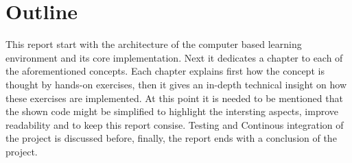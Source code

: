 \section{Outline}

This report start with the architecture of the computer based learning environment and its core implementation. Next it dedicates a chapter to each of the aforementioned concepts. Each chapter explains first how the concept is thought by hands-on exercises, then it gives an in-depth technical insight on how these exercises are implemented. At this point it is needed to be mentioned that the shown code might be simplified to highlight the intersting aspects, improve readability and to keep this report consise. Testing and Continous integration of the project is discussed before, finally, the report ends with a conclusion of the project.
